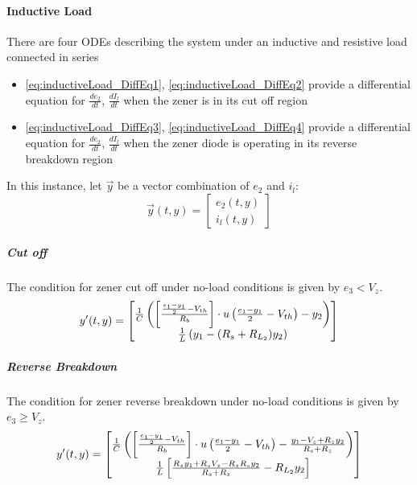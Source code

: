 \paragraph{Inductive Load}
There are four ODEs describing the system under an inductive and resistive load connected in series
\begin{itemize}
	\item \eqref{eq:inductiveLoad_DiffEq1}, \eqref{eq:inductiveLoad_DiffEq2} provide a differential equation for $\frac{de_2}{dt}$, $\frac{dI_l}{dt}$ when the zener is in its cut off region
	\item \eqref{eq:inductiveLoad_DiffEq3}, \eqref{eq:inductiveLoad_DiffEq4} provide a differential equation for $\frac{de_2}{dt}$, $\frac{dI_l}{dt}$ when the zener diode is operating in its reverse breakdown region
\end{itemize}
In this instance, let $\vec{y}$ be a vector combination of $e_2$ and $i_l$:
\begin{equation}
	\vec{y}(t,y) = \begin{bmatrix}
		e_2(t,y) \\
		i_l(t,y)
	\end{bmatrix}
\end{equation}
\subparagraph{Cut off}
The condition for zener cut off under no-load conditions is given by $e_3 < V_z$.
\begin{equation}
	y'(t,y) = \begin{bmatrix}
		 \frac{1}{C}\left(\left[\frac{\frac{e_1 - y_1}{2} - V_{th}}{R_b} \right]\cdot u\left(\frac{e_1 - y_1}{2} - V_{th} \right) - y_2 \right) \\
		 \frac{1}{L}\left(y_1 - (R_s + R_{L_2})y_2 \right)
	\end{bmatrix}
\end{equation}
\subparagraph{Reverse Breakdown}
The condition for zener reverse breakdown under no-load conditions is given by $e_3 \geq V_z$.  
\begin{equation}
	y'(t,y) = \begin{bmatrix}
		 \frac{1}{C}\left(\left[\frac{\frac{e_1 - y_1}{2} - V_{th}}{R_b} \right]\cdot u\left(\frac{e_1 - y_1}{2} - V_{th} \right) - \frac{y_1 - V_z + R_z y_2}{R_s + R_z} \right) \\
		 \frac{1}{L} \left[\frac{R_z y_1 + R_s V_z - R_z R_s y_2}{R_s + R_z} - R_{L_2}y_2 \right]
	\end{bmatrix}
\end{equation}